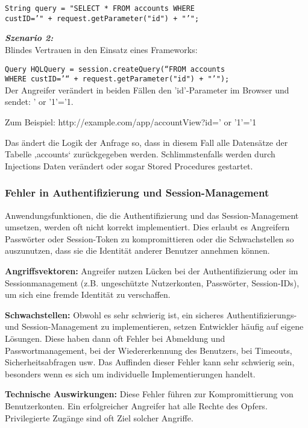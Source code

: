 \texttt{String query = "SELECT * FROM accounts WHERE}\\
\texttt{custID='" + request.getParameter("id") + "'";}

\textbf{\textit{Szenario 2:}}\\
Blindes Vertrauen in den Einsatz eines Frameworks:

\texttt{Query HQLQuery = session.createQuery(“FROM accounts}\\
\texttt{WHERE custID='“ + request.getParameter("id") + "'");}\\
Der Angreifer verändert in beiden Fällen den 'id'-Parameter im Browser und sendet: ' or '1'='1. 

Zum Beispiel: http://example.com/app/accountView?id=' or '1'='1

Das ändert die Logik der Anfrage so, dass in diesem Fall alle Datensätze der Tabelle ‚accounts‘ zurückgegeben werden. Schlimmstenfalls werden durch Injections Daten verändert oder sogar Stored Procedures gestartet\cite[7]{owasp17top10}.

\subsubsection{Fehler in Authentifizierung und Session-Management}

Anwendungsfunktionen, die die Authentifizierung und das Session-Management umsetzen, werden oft nicht korrekt implementiert. Dies erlaubt es Angreifern Passwörter oder Session-Token  zu kompromittieren oder die Schwachstellen so auszunutzen, dass sie die Identität anderer Benutzer annehmen können\cite[6]{owasp17top10}.

\textbf{Angriffsvektoren:} Angreifer nutzen Lücken bei der Authentifizierung oder im Sessionmanagement (z.B. ungeschützte
Nutzerkonten, Passwörter, Session-IDs), um sich eine fremde Identität zu verschaffen\cite[8]{owasp17top10}.

\textbf{Schwachstellen:} Obwohl es sehr schwierig ist, ein sicheres Authentifizierungs- und Session-Management zu implementieren, setzen Entwickler häufig auf eigene Lösungen. Diese haben dann oft Fehler bei Abmeldung und Passwortmanagement, bei der Wiedererkennung des Benutzers, bei Timeouts, Sicherheitsabfragen usw. Das Auffinden dieser Fehler kann sehr schwierig sein, besonders wenn es sich um individuelle Implementierungen handelt\cite[8]{owasp17top10}.

\textbf{Technische Auswirkungen:} Diese Fehler führen zur Kompromittierung von Benutzerkonten. Ein erfolgreicher Angreifer hat alle Rechte des Opfers. Privilegierte Zugänge sind oft Ziel solcher Angriffe\cite[8]{owasp17top10}.

